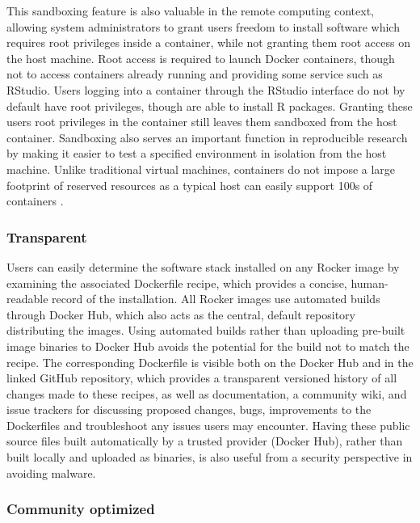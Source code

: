 This sandboxing feature is also valuable in the remote computing
context, allowing system administrators to grant users freedom to
install software which requires root privileges inside a container,
while not granting them root access on the host machine. Root access is
required to launch Docker containers, though not to access containers
already running and providing some service such as RStudio. Users
logging into a container through the
RStudio\textsuperscript{\textregistered} interface do not by default
have root privileges, though are able to install R packages. Granting
these users root privileges in the container still leaves them sandboxed
from the host container. Sandboxing also serves an important function in
reproducible research by making it easier to test a specified
environment in isolation from the host machine. Unlike traditional
virtual machines, containers do not impose a large footprint of reserved
resources as a typical host can easily support 100s of containers
\citep{what-docker}.

\subsubsection{Transparent}\label{transparent}

Users can easily determine the software stack installed on any Rocker
image by examining the associated Dockerfile recipe, which provides a
concise, human-readable record of the installation. All Rocker images
use automated builds through Docker Hub, which also acts as the central,
default repository distributing the images. Using automated builds
rather than uploading pre-built image binaries to Docker Hub avoids the
potential for the build not to match the recipe. The corresponding
Dockerfile is visible both on the Docker Hub and in the linked GitHub
repository, which provides a transparent versioned history of all
changes made to these recipes, as well as documentation, a community
wiki, and issue trackers for discussing proposed changes, bugs,
improvements to the Dockerfiles and troubleshoot any issues users may
encounter. Having these public source files built automatically by a
trusted provider (Docker Hub), rather than built locally and uploaded as
binaries, is also useful from a security perspective in avoiding
malware.

\subsubsection{Community optimized}\label{community-optimized}

